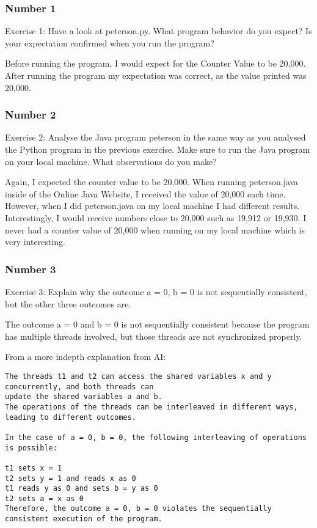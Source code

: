 \documentclass{article}
\theoremstyle{theorem}
\theoremstyle{definition}
\theoremstyle{remark}
\begin{document}
\subsubsection{Number 1}
\noindent\newline Exercise 1: Have a look at peterson.py. What program behavior do you expect? Is your expectation confirmed when you run the program? 

\noindent\newline\newline Before running the program, I would expect for the Counter Value to be 20,000. After running the program my expectation was correct, as the value printed was 20,000.


\subsubsection{Number 2}
\noindent\newline Exercise 2: Analyse the Java program peterson in the same way as you analysed the Python program in the previous exercise. Make sure to run the Java program on your local machine. What observations do you make? 

\noindent\newline\newline Again, I expected the counter value to be 20,000. When running peterson.java inside of the Online Java Website, I received the value of 20,000 each time. However, when I did peterson.java on my local machine I had different results. Interestingly, I would receive numbers close to 20,000 such as 19,912 or 19,930. I never had a counter value of 20,000 when running on my local machine which is very interesting.


\subsubsection{Number 3}
\noindent\newline Exercise 3: Explain why the outcome a = 0, b = 0 is not sequentially consistent, but the other three outcomes are.

\noindent\newline\newline The outcome a = 0 and b = 0 is not sequentially consistent because the program has multiple threads involved, but those threads are not synchronized properly.

\noindent\newline\newline From a more indepth explanation from AI: 
\begin{verbatim}
The threads t1 and t2 can access the shared variables x and y concurrently, and both threads can
update the shared variables a and b. 
The operations of the threads can be interleaved in different ways, leading to different outcomes.

In the case of a = 0, b = 0, the following interleaving of operations is possible:

t1 sets x = 1
t2 sets y = 1 and reads x as 0
t1 reads y as 0 and sets b = y as 0
t2 sets a = x as 0
Therefore, the outcome a = 0, b = 0 violates the sequentially consistent execution of the program.
\end{verbatim}
\end{document}
